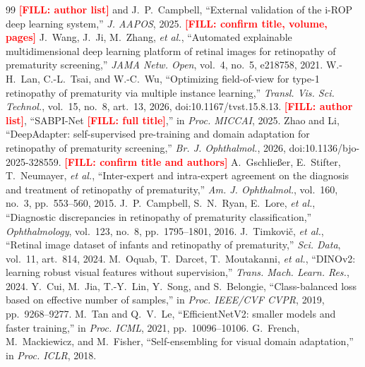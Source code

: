 \documentclass[conference]{IEEEtran}
\newcommand{\FILL}[1]{\textcolor{red}{\textbf{[FILL: #1]}}}
\begin{document}
\begin{thebibliography}{99}
 \FILL{author list} and J.~P.~Campbell, ``External validation of the i-ROP deep learning system,'' \emph{J. AAPOS}, 2025. \FILL{confirm title, volume, pages}
 J.~Wang, J.~Ji, M.~Zhang, \emph{et al.}, ``Automated explainable multidimensional deep learning platform of retinal images for retinopathy of prematurity screening,'' \emph{JAMA Netw. Open}, vol.~4, no.~5, e218758, 2021.
 W.-H.~Lan, C.-L.~Tsai, and W.-C.~Wu, ``Optimizing field-of-view for type-1 retinopathy of prematurity via multiple instance learning,'' \emph{Transl. Vis. Sci. Technol.}, vol.~15, no.~8, art.~13, 2026, doi:10.1167/tvst.15.8.13.
 \FILL{author list}, ``SABPI-Net \FILL{full title},'' in \emph{Proc. MICCAI}, 2025.
 Zhao and Li, ``DeepAdapter: self-supervised pre-training and domain adaptation for retinopathy of prematurity screening,'' \emph{Br. J. Ophthalmol.}, 2026, doi:10.1136/bjo-2025-328559. \FILL{confirm title and authors}
 A.~Gschlie\ss{}er, E.~Stifter, T.~Neumayer, \emph{et al.}, ``Inter-expert and intra-expert agreement on the diagnosis and treatment of retinopathy of prematurity,'' \emph{Am. J. Ophthalmol.}, vol.~160, no.~3, pp.~553--560, 2015.
 J.~P.~Campbell, S.~N.~Ryan, E.~Lore, \emph{et al.}, ``Diagnostic discrepancies in retinopathy of prematurity classification,'' \emph{Ophthalmology}, vol.~123, no.~8, pp.~1795--1801, 2016.
 J.~Timkovi\v{c}, \emph{et al.}, ``Retinal image dataset of infants and retinopathy of prematurity,'' \emph{Sci. Data}, vol.~11, art.~814, 2024.
 M.~Oquab, T.~Darcet, T.~Moutakanni, \emph{et al.}, ``DINOv2: learning robust visual features without supervision,'' \emph{Trans. Mach. Learn. Res.}, 2024.
 Y.~Cui, M.~Jia, T.-Y.~Lin, Y.~Song, and S.~Belongie, ``Class-balanced loss based on effective number of samples,'' in \emph{Proc. IEEE/CVF CVPR}, 2019, pp.~9268--9277.
 M.~Tan and Q.~V.~Le, ``EfficientNetV2: smaller models and faster training,'' in \emph{Proc. ICML}, 2021, pp.~10096--10106.
 G.~French, M.~Mackiewicz, and M.~Fisher, ``Self-ensembling for visual domain adaptation,'' in \emph{Proc. ICLR}, 2018.
\end{thebibliography}
\end{document}
